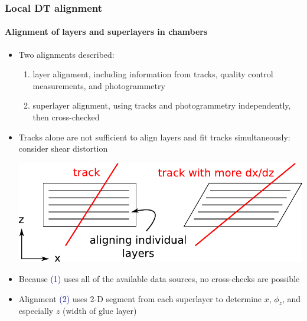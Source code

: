 \documentclass[compress]{beamer}
\begin{document}
\begin{frame}
\frametitle{Local DT alignment}
\framesubtitle{Alignment of layers and superlayers in chambers}

\begin{itemize}
\item Two alignments described:
\begin{enumerate}
\item layer alignment, including information from tracks, quality control measurements, and photogrammetry
\item superlayer alignment, using tracks and photogrammetry independently, then cross-checked
\end{enumerate}

\item Tracks alone are not sufficient to align layers and fit tracks simultaneously: consider shear distortion
\begin{center}
\includegraphics[width=0.6\linewidth]{shear.pdf}
\end{center}

\item Because \textcolor{darkblue}{(1)} uses all of the available data sources, no cross-checks are possible

\item Alignment \textcolor{darkblue}{(2)} uses 2-D segment from each
  superlayer to determine $x$, $\phi_z$, and especially $z$ (width of
  glue layer)

\end{itemize}
\end{frame}
\end{document}
